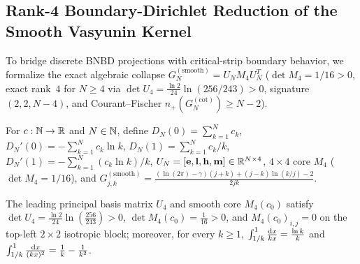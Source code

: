 \subsection{Rank-4 Boundary-Dirichlet Reduction of the Smooth Vasyunin Kernel}
\label{subsec:rank4_boundary_dirichlet}

To bridge discrete BNBD projections with critical-strip boundary behavior, we formalize the exact algebraic collapse $G_N^{(\mathrm{smooth})} = U_N M_4 U_N^T$ ($\det M_4 = 1/16 > 0$, exact rank~$4$ for $N \ge 4$ via $\det U_4 = \frac{\ln 2}{24}\ln(256/243) > 0$, signature $(2,2,N-4)$, and Courant--Fischer $n_+(G_N^{(\mathrm{cot})}) \ge N - 2$).

\begin{definition}
\label{def:bdr_functionals}
\leanok
For $c : \mathbb{N} \to \mathbb{R}$ and $N \in \mathbb{N}$, define $D_N(0) = \sum_{k=1}^N c_k$, $D_N'(0) = -\sum_{k=1}^N c_k \ln k$, $D_N(1) = \sum_{k=1}^N c_k/k$, $D_N'(1) = -\sum_{k=1}^N (c_k \ln k)/k$, $U_N = [\mathbf{e}, \mathbf{l}, \mathbf{h}, \mathbf{m}] \in \mathbb{R}^{N \times 4}$, $4 \times 4$ core $M_4$ ($\det M_4 = 1/16$), and $G_{j,k}^{(\mathrm{smooth})} = \frac{(\ln(2\pi)-\gamma)(j+k) + (j-k)\ln(k/j) - 2}{2jk}$.
\end{definition}

\begin{lemma}
\label{lem:rank4_det_and_dilations}
\leanok
The leading principal basis matrix $U_4$ and smooth core $M_4(c_0)$ satisfy $\det U_4 = \frac{\ln 2}{24}\ln\!\left(\frac{256}{243}\right) > 0$, $\det M_4(c_0) = \frac{1}{16} > 0$, and $M_4(c_0)_{i,j} = 0$ on the top-left $2 \times 2$ isotropic block; moreover, for every $k \ge 1$, $\int_{1/k}^1 \frac{\mathrm{d} x}{k x} = \frac{\ln k}{k}$ and $\int_{1/k}^1 \frac{\mathrm{d} x}{(k x)^2} = \frac{1}{k} - \frac{1}{k^2}$.
\end{lemma}

